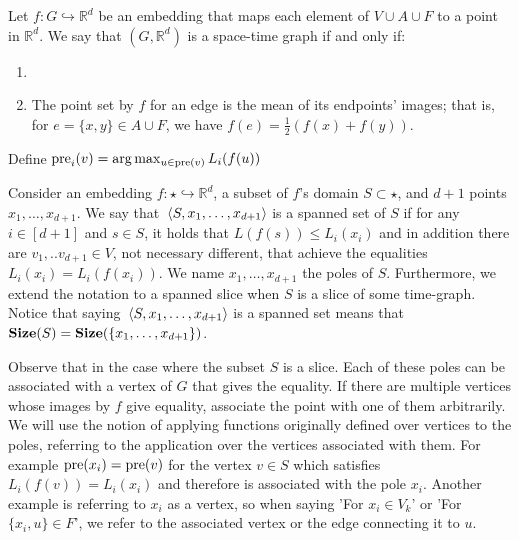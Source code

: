   \begin{definition}
Let $f \colon G \hookrightarrow \mathbb{R}^{d}$ be an embedding that maps each element of $V \cup A \cup F$ to a point in $\mathbb{R}^{d}$. We say that $\left( G, \mathbb{R}^{d} \right) $ is a space-time graph if and only if: 
\begin{enumerate}
  \item \item The point set by $f$ for an edge is the mean of its endpoints' images; that is, for $e = \{x,y\} \in A \cup F$, we have $f(e) = \frac{1}{2}\left(f(x) + f(y)\right)$.
\end{enumerate}
  \end{definition}

  \begin{definition}
    Define $\text{pre}_{i}(v) = \arg\max_{u \in \text{pre}(v)}L_{i}(f(u))$
  \end{definition}



  \begin{definition}
    Consider an embedding $f \colon \star \hookrightarrow \mathbb{R}^{d}$, a subset of $f$'s domain $S \subset \star$, and $d+1$ points $x_{1}, \ldots, x_{d+1}$. We say that $\expval*{S, x_{1}, \ldots, x_{d+1}}$ is a spanned set of $S$ if for any $i \in [d+1]$ and $s \in S$, it holds that $L(f(s)) \le L_{i}(x_{i})$ and in addition there are $v_{1},..v_{d+1} \in V$, not necessary different, that achieve the equalities $L_{i}(x_{i}) = L_{i}(f(x_{i}))$.  We name $x_{1}, \ldots, x_{d+1}$ the poles of $S$. Furthermore, we extend the notation to a spanned slice when $S$ is a slice of some time-graph. Notice that saying $\expval*{S, x_{1}, \ldots, x_{d+1}}$ is a spanned set means that $\mathbf{Size}(S) = \mathbf{Size}( \{x_{1}, \ldots, x_{d+1}\})$.
  \end{definition}
  Observe that in the case where the subset $S$ is a slice. Each of these poles can be associated with a vertex of $G$ that gives the equality. If there are multiple vertices whose images by $f$ give equality, associate the point with one of them arbitrarily. We will use the notion of applying functions originally defined over vertices to the poles, referring to the application over the vertices associated with them. For example $\text{pre}(x_{i}) = \text{pre}(v)$ for the vertex $v \in S$ which satisfies $L_{i}(f(v)) = L_{i}(x_i)$ and therefore is associated with the pole $x_{i}$. 
 Another example is referring to $x_{i}$ as a vertex, so when saying 'For $x_{i} \in V_{k}$' or 'For $\{x_{i},u\} \in F$', we refer to the associated vertex or the edge connecting it to $u$.

